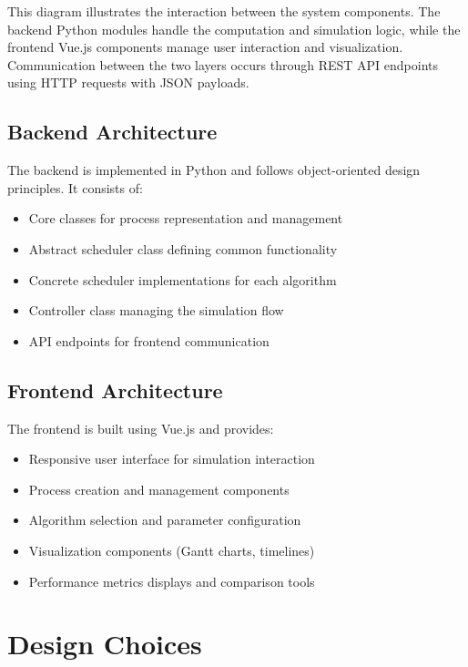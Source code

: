 \documentclass[12pt,a4paper]{report}
\begin{document}
This diagram illustrates the interaction between the system components. The backend Python modules handle the computation and simulation logic, while the frontend Vue.js components manage user interaction and visualization. Communication between the two layers occurs through REST API endpoints using HTTP requests with JSON payloads.

\section{Backend Architecture}
The backend is implemented in Python and follows object-oriented design principles. It consists of:
\begin{itemize}
    \item Core classes for process representation and management
    \item Abstract scheduler class defining common functionality
    \item Concrete scheduler implementations for each algorithm
    \item Controller class managing the simulation flow
    \item API endpoints for frontend communication
\end{itemize}

\section{Frontend Architecture}
The frontend is built using Vue.js and provides:
\begin{itemize}
    \item Responsive user interface for simulation interaction
    \item Process creation and management components
    \item Algorithm selection and parameter configuration
    \item Visualization components (Gantt charts, timelines)
    \item Performance metrics displays and comparison tools
\end{itemize}

\chapter{Design Choices}
\end{document}
